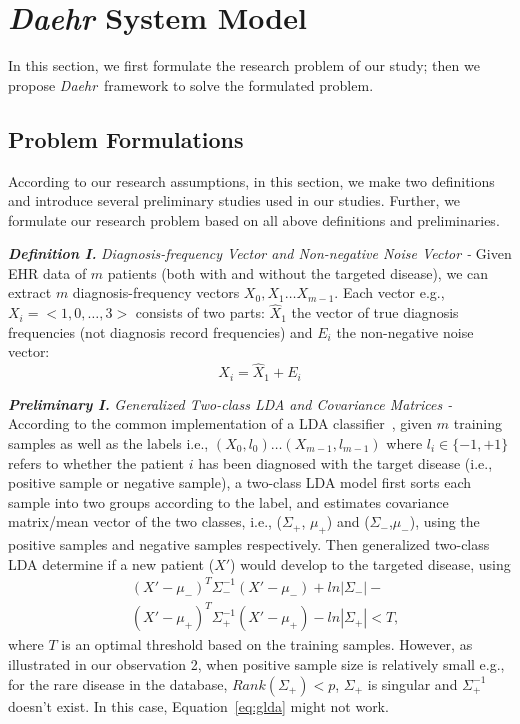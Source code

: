 \documentclass[journal,compsoc]{IEEEtran}
\newcommand{\TheName}{\mbox{\emph{Daehr}}}
\begin{document}
\section{\TheName{} System Model}\label{sec:3}
In this section, we first formulate the research problem of our study; then we propose \TheName\ framework to solve the formulated problem.

\subsection{Problem Formulations}
According to our research assumptions, in this section, we make two definitions and introduce several preliminary studies used in our studies. Further, we formulate our research problem based on all above definitions and preliminaries.

\textbf{\em Definition I.} \emph{Diagnosis-frequency Vector and Non-negative Noise Vector - } Given EHR data of $m$ patients (both with and without the targeted disease), we can extract $m$ diagnosis-frequency vectors $X_0,X_1\dots X_{m-1}$. Each vector e.g., $X_i=<1,0,\dots,3>$ consists of two parts: $\hat{X}_1$ the vector of true diagnosis frequencies (not diagnosis record frequencies) and $E_i$ the non-negative noise vector:
\begin{equation}
X_i=\hat{X}_1+E_i
\end{equation}

\textbf{\em Preliminary I. }\emph{Generalized Two-class LDA and Covariance Matrices - } According to the common implementation of a LDA classifier~\cite{ziegel2003modern}, given $m$  training samples as well as the labels i.e., $(X_0,l_0)\dots (X_{m-1},l_{m-1})$ where $l_i\in\{-1,+1\}$ refers to whether the patient $i$ has been diagnosed with the target disease (i.e., positive sample or negative sample),  a two-class LDA  model first sorts each sample into two groups according to the label, and estimates covariance matrix/mean vector of the two classes, i.e., ($\Sigma_{+}$, $\mu_+$) and ($\Sigma_{-}$,$\mu_-$), using the positive samples and negative samples respectively.  Then generalized two-class LDA determine if a new patient ($X'$) would develop to the targeted disease, using
%
\begin{equation}
\begin{aligned}
&(X'-\mu_-)^T\Sigma_{-}^{-1}(X'-\mu_-)+ln|\Sigma_-|-\\
&(X'-\mu_+)^T\Sigma_{+}^{-1}(X'-\mu_+)-ln|\Sigma_+|<T,
\end{aligned}
\label{eq:glda}
\end{equation}
%
where $T$ is an optimal threshold based on the training samples. However, as illustrated in our observation 2,  when positive sample size is relatively small e.g., for the rare disease in the database,  $Rank(\Sigma_+)<p$,  $\Sigma_{+}$ is singular and $\Sigma_{+}^{-1}$  doesn't exist. In this case, Equation~\ref{eq:glda} might not work.
\end{document}
